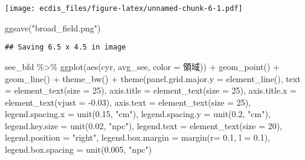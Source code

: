 \documentclass[
]{article}
\newenvironment{Shaded}{\begin{snugshade}}{\end{snugshade}}
\newcommand{\AttributeTok}[1]{\textcolor[rgb]{0.77,0.63,0.00}{#1}}
\newcommand{\DecValTok}[1]{\textcolor[rgb]{0.00,0.00,0.81}{#1}}
\newcommand{\FloatTok}[1]{\textcolor[rgb]{0.00,0.00,0.81}{#1}}
\newcommand{\FunctionTok}[1]{\textcolor[rgb]{0.00,0.00,0.00}{#1}}
\newcommand{\NormalTok}[1]{#1}
\newcommand{\SpecialCharTok}[1]{\textcolor[rgb]{0.00,0.00,0.00}{#1}}
\newcommand{\StringTok}[1]{\textcolor[rgb]{0.31,0.60,0.02}{#1}}
\begin{document}
\texttt{[image: ecdis\_files/figure-latex/unnamed-chunk-6-1.pdf]}

\begin{Shaded}
\begin{Highlighting}[]
\FunctionTok{ggsave}\NormalTok{(}\StringTok{"broad\_field.png"}\NormalTok{)}
\end{Highlighting}
\end{Shaded}

\begin{verbatim}
## Saving 6.5 x 4.5 in image
\end{verbatim}

\begin{Shaded}
\begin{Highlighting}[]
\NormalTok{see\_bfd }\SpecialCharTok{\%\textgreater{}\%}
  \FunctionTok{ggplot}\NormalTok{(}\FunctionTok{aes}\NormalTok{(cyr, avg\_see, }\AttributeTok{color =}\NormalTok{ 領域)) }\SpecialCharTok{+}
  \FunctionTok{geom\_point}\NormalTok{() }\SpecialCharTok{+}
  \FunctionTok{geom\_line}\NormalTok{() }\SpecialCharTok{+}
  \FunctionTok{theme\_bw}\NormalTok{() }\SpecialCharTok{+}
  \FunctionTok{theme}\NormalTok{(}\AttributeTok{panel.grid.major.y =} \FunctionTok{element\_line}\NormalTok{(), }
        \AttributeTok{text =} \FunctionTok{element\_text}\NormalTok{(}\AttributeTok{size =} \DecValTok{25}\NormalTok{), }
        \AttributeTok{axis.title =} \FunctionTok{element\_text}\NormalTok{(}\AttributeTok{size =} \DecValTok{25}\NormalTok{),}
        \AttributeTok{axis.title.x =} \FunctionTok{element\_text}\NormalTok{(}\AttributeTok{vjust =} \SpecialCharTok{{-}}\FloatTok{0.03}\NormalTok{),}
        \AttributeTok{axis.text =} \FunctionTok{element\_text}\NormalTok{(}\AttributeTok{size =} \DecValTok{25}\NormalTok{),}
        \AttributeTok{legend.spacing.x =} \FunctionTok{unit}\NormalTok{(}\FloatTok{0.15}\NormalTok{, }\StringTok{"cm"}\NormalTok{),}
        \AttributeTok{legend.spacing.y =} \FunctionTok{unit}\NormalTok{(}\FloatTok{0.2}\NormalTok{, }\StringTok{"cm"}\NormalTok{),}
        \AttributeTok{legend.key.size =} \FunctionTok{unit}\NormalTok{(}\FloatTok{0.02}\NormalTok{, }\StringTok{"npc"}\NormalTok{),}
        \AttributeTok{legend.text =} \FunctionTok{element\_text}\NormalTok{(}\AttributeTok{size =} \DecValTok{20}\NormalTok{),}
        \AttributeTok{legend.position =} \StringTok{"right"}\NormalTok{,}
        \AttributeTok{legend.box.margin =} \FunctionTok{margin}\NormalTok{(}\AttributeTok{r=} \FloatTok{0.1}\NormalTok{, }\AttributeTok{l =} \FloatTok{0.1}\NormalTok{),}
        \AttributeTok{legend.box.spacing =} \FunctionTok{unit}\NormalTok{(}\FloatTok{0.005}\NormalTok{, }\StringTok{"npc"}\NormalTok{)}

\end{Highlighting}
\end{Shaded}
\end{document}
